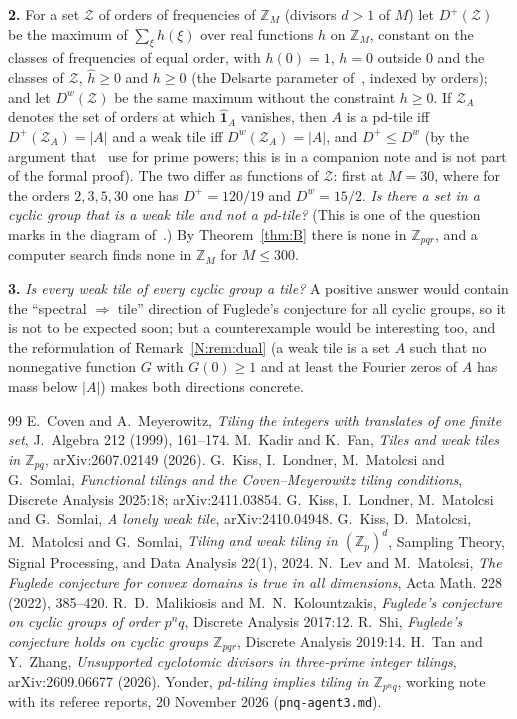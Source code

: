 \documentclass[11pt,a4paper]{amsart}
\theoremstyle{definition}
\theoremstyle{remark}
\newcommand{\Z}{\mathbb{Z}}
\newcommand{\one}{\mathbf{1}}
\newcommand{\lean}[1]{\texttt{#1}}
\begin{document}
\textbf{2.} For a set $\mathcal Z$ of orders of frequencies of $\Z_M$ (divisors $d>1$ of $M$) let $D^+(\mathcal Z)$ be the
maximum of $\sum_\xi h(\xi)$ over real functions $h$ on $\Z_M$, constant on the classes of frequencies of equal
order, with $h(0)=1$, $h=0$ outside $0$ and the classes of $\mathcal Z$, $\hat h\ge 0$ and $h\ge 0$ (the Delsarte
parameter of~\cite{KLMS}, indexed by orders); and let $D^w(\mathcal Z)$ be the same maximum without the constraint
$h\ge 0$. If $\mathcal Z_A$ denotes the set of orders at which $\hat{\one}_A$ vanishes, then $A$ is a pd-tile iff
$D^+(\mathcal Z_A)=|A|$ and a weak tile iff $D^w(\mathcal Z_A)=|A|$, and $D^+\le D^w$ (by the argument that~\cite{KLMS} use for
prime powers; this is in a companion note and is not part of the formal proof). The two differ as functions of
$\mathcal Z$: first at $M=30$, where for the orders $2,3,5,30$ one has $D^+=120/19$ and $D^w=15/2$. \emph{Is there a
set in a cyclic group that is a weak tile and not a pd-tile?} (This is one of the question marks in the diagram
of~\cite{KF}.) By Theorem~\ref{thm:B} there is none in $\Z_{pqr}$, and a computer search finds none in $\Z_M$
for $M\le 300$.

\textbf{3.} \emph{Is every weak tile of every cyclic group a tile?} A positive answer would contain the
``spectral $\Rightarrow$ tile'' direction of Fuglede's conjecture for all cyclic groups, so it is not to be
expected soon; but a counterexample would be interesting too, and the reformulation of Remark~\ref{N:rem:dual}
(a weak tile is a set $A$ such that no nonnegative function $G$ with $G(0)\ge 1$ and at least the Fourier zeros
of $A$ has mass below $|A|$) makes both directions concrete.


\begin{thebibliography}{99}
 E.~Coven and A.~Meyerowitz, \emph{Tiling the integers with translates of one finite set},
 J.~Algebra 212 (1999), 161--174.
 M.~Kadir and K.~Fan, \emph{Tiles and weak tiles in $\Z_{pq}$}, arXiv:2607.02149 (2026).
 G.~Kiss, I.~Londner, M.~Matolcsi and G.~Somlai, \emph{Functional tilings and the
 Coven--Meyerowitz tiling conditions}, Discrete Analysis 2025:18; arXiv:2411.03854.
 G.~Kiss, I.~Londner, M.~Matolcsi and G.~Somlai, \emph{A lonely weak tile}, arXiv:2410.04948.
 G.~Kiss, D.~Matolcsi, M.~Matolcsi and G.~Somlai, \emph{Tiling and weak tiling in $(\Z_p)^d$},
 Sampling Theory, Signal Processing, and Data Analysis 22(1), 2024.
 N.~Lev and M.~Matolcsi, \emph{The Fuglede conjecture for convex domains is true in all
 dimensions}, Acta Math. 228 (2022), 385--420.
 R.~D.~Malikiosis and M.~N.~Kolountzakis, \emph{Fuglede's conjecture on cyclic groups of order
 $p^nq$}, Discrete Analysis 2017:12.
 R.~Shi, \emph{Fuglede's conjecture holds on cyclic groups $\Z_{pqr}$}, Discrete Analysis 2019:14.
 H.~Tan and Y.~Zhang, \emph{Unsupported cyclotomic divisors in three-prime integer tilings},
 arXiv:2609.06677 (2026).
 Yonder, \emph{pd-tiling implies tiling in $\Z_{p^nq}$}, working note with its referee
 reports, 20 November 2026 (\lean{pnq-agent3.md}).
\end{thebibliography}
\end{document}

